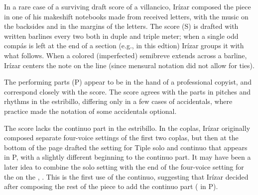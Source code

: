 
\begin{notesources}

\begin{source}
\end{source}

\begin{source}
\end{source}

\end{notesources}

In a rare case of a surviving draft score of a villancico, Irízar composed the piece in one of his makeshift notebooks made from received letters, with the music on the backsides and in the margins of the letters.
The score (S) is drafted with written barlines every two  both in duple and triple meter; when a single odd compás is left at the end of a section (e.g.,  in this edtion) Irízar groups it with what follows.
When a colored (imperfected) semibreve extends across a barline, Irízar centers the note on the line (since mensural notation did not allow for ties).

The performing parts (P) appear to be in the hand of a professional copyist, and correspond closely with the score.
The score agrees with the parts in pitches and rhythms in the estribillo, differing only in a few cases of accidentals, where  practice made the notation of some accidentals optional.

The score lacks the  continuo part in the estribillo.
In the coplas, Irízar originally composed separate four-voice settings of the first two coplas, but then at the bottom of the page drafted the setting for Tiple solo and continuo that appears in P, with a slightly different beginning to the continuo part.
It may have been a later idea to combine the solo setting with the end of the four-voice setting for the  on the , .
This is the first use of the continuo, suggesting that Irízar decided after composing the rest of the piece to add the continuo part ( in P).

